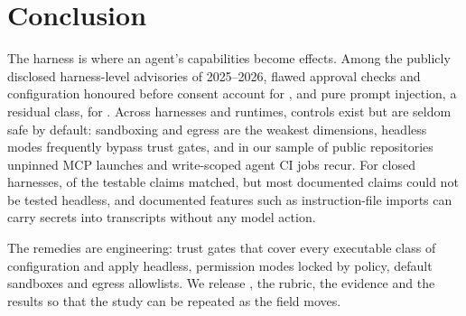 \section{Conclusion}\label{sec:conclusion}

The harness is where an agent's capabilities become effects. Among the publicly disclosed harness-level advisories of 2025--2026, flawed approval checks and configuration honoured before consent account for \pctRCTwoThree{}, and pure prompt injection, a residual class, for \pctRCOne{}. Across \nHarnesses{} harnesses and runtimes, controls exist but are seldom safe by default: sandboxing and egress are the weakest dimensions, headless modes frequently bypass trust gates, and in our sample of public repositories unpinned MCP launches and write-scoped agent CI jobs recur. For closed harnesses, \nClaimsMatch{} of the \nClaimsTested{} testable claims matched, but most documented claims could not be tested headless, and documented features such as instruction-file imports can carry secrets into transcripts without any model action.

The remedies are engineering: trust gates that cover every executable class of configuration and apply headless, permission modes locked by policy, default sandboxes and egress allowlists. We release \tool{}, the rubric, the evidence and the results so that the study can be repeated as the field moves.
